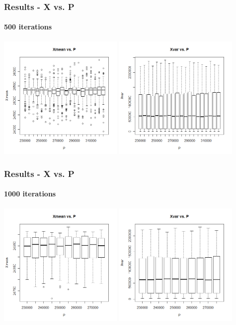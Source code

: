 \begin{frame}
    \frametitle{Results - X vs. P }
	\framesubtitle{500 iterations}
\hspace*{-5mm}
\includegraphics[height=6cm]{boxplot500_xmean_P}
\includegraphics[height=6cm]{boxplot500_xvar_P}
\end{frame}

\begin{frame}
    \frametitle{Results - X vs. P }
	\framesubtitle{1000 iterations}
\hspace*{-5mm}
\includegraphics[height=6cm]{boxplot1000_xmean_P}
\includegraphics[height=6cm]{boxplot1000_xvar_P}
\end{frame}





